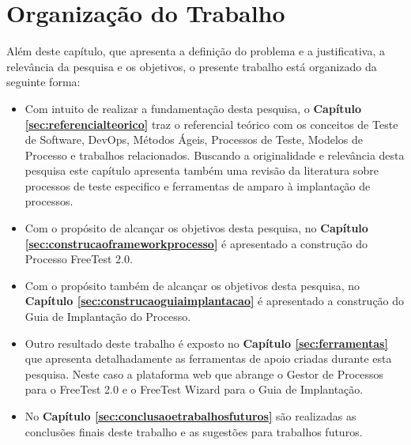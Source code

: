 \section{Organização do Trabalho}
\label{cap:estrutura}

Além deste capítulo, que apresenta a definição do problema e a justificativa, a relevância da pesquisa e os objetivos, o presente trabalho está organizado da seguinte forma:

\begin{itemize}
    \item Com intuito de realizar a fundamentação desta pesquisa, o \textbf{Capítulo     \ref{sec:referencialteorico}} traz o referencial teórico com os conceitos de Teste de Software, DevOps, Métodos Ágeis, Processos de Teste, Modelos de Processo e trabalhos relacionados. Buscando a originalidade e relevância desta pesquisa este capítulo apresenta também uma revisão da literatura sobre processos de teste especifico e ferramentas de amparo à implantação de processos.
    \item Com o propósito de alcançar os objetivos desta pesquisa, no \textbf{Capítulo \ref{sec:construcaoframeworkprocesso}} é apresentado a construção do Processo FreeTest 2.0.
    \item Com o propósito também de alcançar os objetivos desta pesquisa, no \textbf{Capítulo \ref{sec:construcaoguiaimplantacao}} é apresentado a construção do Guia de Implantação do Processo.
    \item Outro resultado deste trabalho é exposto no \textbf{Capítulo \ref{sec:ferramentas}} que apresenta detalhadamente as ferramentas de apoio criadas durante esta pesquisa. Neste caso a plataforma web que abrange o Gestor de Processos para o FreeTest 2.0 e o FreeTest Wizard para o Guia de Implantação.
    \item No \textbf{Capítulo \ref{sec:conclusaoetrabalhosfuturos}} são realizadas as conclusões finais deste trabalho e as sugestões para trabalhos futuros.
\end{itemize}
